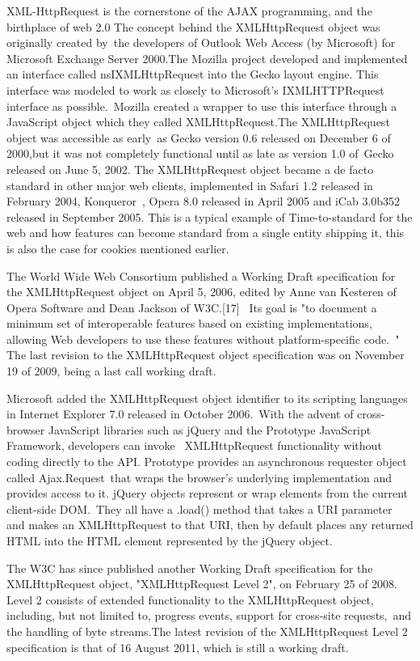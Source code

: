 \documentclass[a4paper,12pt]{paper}
\begin{document}
XML-HttpRequest is the cornerstone of the AJAX programming, and the birthplace of web 2.0 The concept behind the XMLHttpRequest object was originally created by\
the developers of Outlook Web Access (by Microsoft) for Microsoft Exchange Server 2000.The Mozilla project developed and implemented an interface called nsIXMLHttpRequest into the Gecko layout engine.
This interface was modeled to work as closely to Microsoft's IXMLHTTPRequest interface as possible.\
Mozilla created a wrapper to use this interface through a JavaScript object which they called XMLHttpRequest.The XMLHttpRequest object was accessible as early\
as Gecko version 0.6 released on December 6 of 2000,but it was not completely functional until as late as version 1.0 of\
Gecko released on June 5, 2002. The XMLHttpRequest object became a de facto standard in other major web clients, implemented in Safari 1.2 released in February 2004, Konqueror\
, Opera 8.0 released in April 2005 and iCab 3.0b352 released in September 2005. This is a typical example of Time-to-standard for the web and how features can become standard from a
single entity shipping it, this is also the case for cookies mentioned earlier.\

The World Wide Web Consortium published a Working Draft specification for the XMLHttpRequest object on April 5, 2006, edited by Anne van Kesteren of Opera Software and Dean Jackson of W3C.[17] \
Its goal is "to document a minimum set of interoperable features based on existing implementations, allowing Web developers to use these features without platform-specific code.\
" The last revision to the XMLHttpRequest object specification was on November 19 of 2009, being a last call working draft.\

Microsoft added the XMLHttpRequest object identifier to its scripting languages in Internet Explorer 7.0 released in October 2006.\
With the advent of cross-browser JavaScript libraries such as jQuery and the Prototype JavaScript Framework, developers can invoke \
XMLHttpRequest functionality without coding directly to the API. Prototype provides an asynchronous requester object called Ajax.Request\
that wraps the browser's underlying implementation and provides access to it. jQuery objects represent or wrap elements from the current client-side DOM.\
They all have a .load() method that takes a URI parameter and makes an XMLHttpRequest to that URI, then by default places any returned HTML into the HTML element represented by the jQuery object.\

The W3C has since published another Working Draft specification for the XMLHttpRequest object, "XMLHttpRequest Level 2", on February 25 of 2008.
Level 2 consists of extended functionality to the XMLHttpRequest object, including, but not limited to, progress events, support for cross-site requests,\
and the handling of byte streams.The latest revision of the XMLHttpRequest Level 2 specification is that of 16 August 2011, which is still a working draft.\
\end{document}

